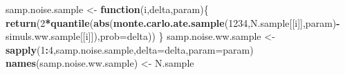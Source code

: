 \documentclass[]{book}
\newenvironment{Shaded}{\begin{snugshade}}{\end{snugshade}}
\newcommand{\KeywordTok}[1]{\textcolor[rgb]{0.13,0.29,0.53}{\textbf{#1}}}
\newcommand{\DataTypeTok}[1]{\textcolor[rgb]{0.13,0.29,0.53}{#1}}
\newcommand{\DecValTok}[1]{\textcolor[rgb]{0.00,0.00,0.81}{#1}}
\newcommand{\StringTok}[1]{\textcolor[rgb]{0.31,0.60,0.02}{#1}}
\newcommand{\ControlFlowTok}[1]{\textcolor[rgb]{0.13,0.29,0.53}{\textbf{#1}}}
\newcommand{\OperatorTok}[1]{\textcolor[rgb]{0.81,0.36,0.00}{\textbf{#1}}}
\newcommand{\NormalTok}[1]{#1}
\theoremstyle{definition}
\theoremstyle{definition}
\theoremstyle{definition}
\theoremstyle{remark}
\begin{document}
\begin{Shaded}
\begin{Highlighting}[]
\NormalTok{samp.noise.sample <-}\StringTok{ }\ControlFlowTok{function}\NormalTok{(i,delta,param)\{}
  \KeywordTok{return}\NormalTok{(}\DecValTok{2}\OperatorTok{*}\KeywordTok{quantile}\NormalTok{(}\KeywordTok{abs}\NormalTok{(}\KeywordTok{monte.carlo.ate.sample}\NormalTok{(}\DecValTok{1234}\NormalTok{,N.sample[[i]],param)}\OperatorTok{-}\NormalTok{simuls.ww.sample[[i]]),}\DataTypeTok{prob=}\NormalTok{delta))}
\NormalTok{\}}
\NormalTok{samp.noise.ww.sample <-}\StringTok{ }\KeywordTok{sapply}\NormalTok{(}\DecValTok{1}\OperatorTok{:}\DecValTok{4}\NormalTok{,samp.noise.sample,}\DataTypeTok{delta=}\NormalTok{delta,}\DataTypeTok{param=}\NormalTok{param)}
\KeywordTok{names}\NormalTok{(samp.noise.ww.sample) <-}\StringTok{ }\NormalTok{N.sample}


\end{Highlighting}
\end{Shaded}
\end{document}
